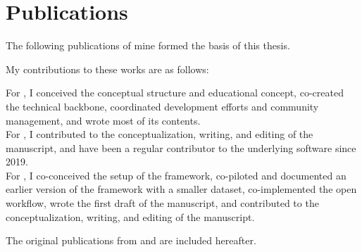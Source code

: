 
\chapter{Publications}

The following publications of mine formed the basis of this thesis.



\begin{refsection}
\nocite{Halchenko2021, wagner2020datalad, wagner2022fairly}
\begin{refcontext}[sorting=nyt]  
	\printbibliography[heading=none, resetnumbers=true]
\end{refcontext}

My contributions to these works are as follows:

For \citet{wagner2020datalad}, I conceived the conceptual structure and educational concept, co-created the technical backbone, coordinated development efforts and community management, and wrote most of its contents.\\
For \citet{Halchenko2021}, I contributed to the conceptualization, writing, and editing of the manuscript, and have been a regular contributor to the underlying software since 2019.\\
For \citet{wagner2022fairly}, I co-conceived the setup of the framework, co-piloted and documented an earlier version of the framework with a smaller dataset, co-implemented the open workflow, wrote the first draft of the manuscript, and contributed to the conceptualization, writing, and editing of the manuscript.

The original publications from \citet{Halchenko2021} and \citet{wagner2022fairly} are included hereafter.



\end{refsection}
